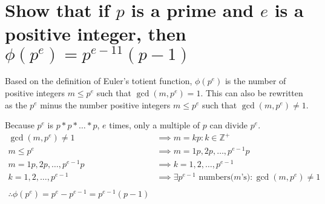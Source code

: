 \documentclass[letterpaper]{article}
\begin{document}
\section{Show that if $p$ is a prime and $e$ is a positive integer, then $\phi(p^e) = p^{e-11}(p - 1)$}

Based on the definition of Euler's totient function, $\phi(p^e)$ is the number of positive integers $m\leq p^e$ such that $\gcd(m,p^e)=1$. This can also be rewritten as the $p^e$ minus the number positive integers $m\leq p^e$ such that $\gcd(m,p^e)\neq1$.

Because $p^e$ is $p*p*\ldots*p$, $e$ times, only a multiple of $p$ can divide $p^e$.
\begin{align*}
\gcd(m,p^e) \neq 1 &\implies m= kp: k\in \mathbb{Z^+}\\
m \leq p^e &\implies m=1p,2p,\ldots,p^{e-1}p\\
m=1p,2p,\ldots,p^{e-1}p &\implies k=1,2,\ldots,p^{e-1}\\
k=1,2,\ldots,p^{e-1} &\implies \exists p^{e-1}\text{ numbers($m$'s)}: \gcd(m,p^e) \neq 1\\~\\
\therefore \phi(p^e) = p^e-p^{e-1} = p^{e-1}(p-1)
\end{align*}
\end{document}
